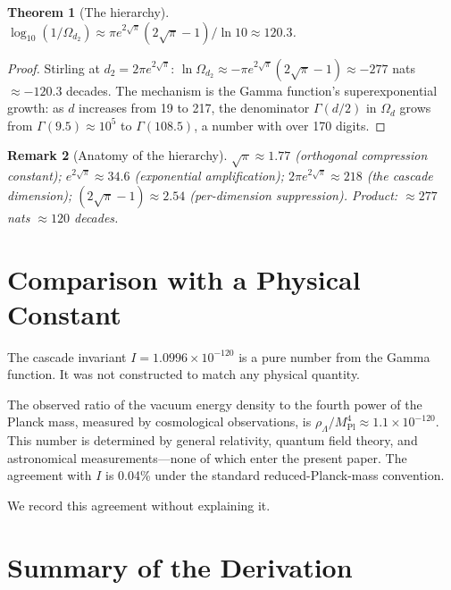 \documentclass[11pt,a4paper]{article}
\newtheorem{theorem}{Theorem}[section]
\newtheorem{remark}[theorem]{Remark}
\begin{document}
\begin{theorem}[The hierarchy]
$\log_{10}(1/\Omega_{d_2})\approx\pi e^{2\sqrt{\pi}}(2\sqrt{\pi}-1)/\ln 10\approx 120.3$.
\end{theorem}

\begin{proof}
Stirling at $d_2 = 2\pi e^{2\sqrt{\pi}}$: $\ln\Omega_{d_2}\approx -\pi e^{2\sqrt{\pi}}(2\sqrt{\pi}-1)\approx -277$ nats $\approx -120.3$ decades. The mechanism is the Gamma function's superexponential growth: as $d$ increases from 19 to 217, the denominator $\Gamma(d/2)$ in $\Omega_d$ grows from $\Gamma(9.5)\approx 10^5$ to $\Gamma(108.5)$, a number with over 170 digits.
\end{proof}

\begin{remark}[Anatomy of the hierarchy]
$\sqrt{\pi}\approx 1.77$ (orthogonal compression constant); $e^{2\sqrt{\pi}}\approx 34.6$ (exponential amplification); $2\pi e^{2\sqrt{\pi}}\approx 218$ (the cascade dimension); $(2\sqrt{\pi}-1)\approx 2.54$ (per-dimension suppression). Product: $\approx 277$ nats $\approx 120$ decades.
\end{remark}

\section{Comparison with a Physical Constant}

The cascade invariant $I = 1.0996\times 10^{-120}$ is a pure number from the Gamma function. It was not constructed to match any physical quantity.

The observed ratio of the vacuum energy density to the fourth power of the Planck mass, measured by cosmological observations, is $\rho_\Lambda/M^4_{\mathrm{Pl}}\approx 1.1\times 10^{-120}$. This number is determined by general relativity, quantum field theory, and astronomical measurements---none of which enter the present paper. The agreement with $I$ is 0.04\% under the standard reduced-Planck-mass convention.

We record this agreement without explaining it.

\section{Summary of the Derivation}
\end{document}
